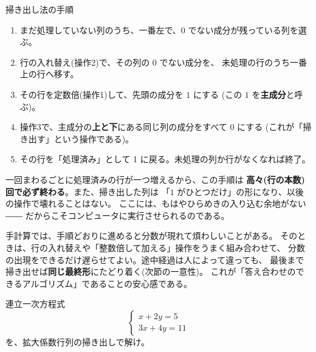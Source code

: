 \begin{itembox}[l]{掃き出し法の手順}
\begin{enumerate}
\item まだ処理していない列のうち、一番左で、$0$ でない成分が残っている列を選ぶ。
\item 行の入れ替え(操作2)で、その列の $0$ でない成分を、
未処理の行のうち一番上の行へ移す。
\item その行を定数倍(操作1)して、先頭の成分を $1$ にする
(この $1$ を\textbf{主成分}と呼ぶ)。
\item 操作3で、主成分の\textbf{上と下}にある同じ列の成分をすべて $0$ にする
(これが「掃き出す」という操作である)。
\item その行を「処理済み」として 1 に戻る。未処理の列か行がなくなれば終了。
\end{enumerate}
\end{itembox}

一回まわるごとに処理済みの行が一つ増えるから、この手順は
\textbf{高々(行の本数)回で必ず終わる}。また、掃き出した列は
「$1$ がひとつだけ」の形になり、以後の操作で壊れることはない。
ここには、もはやひらめきの入り込む余地がない――
だからこそコンピュータに実行させられるのである。

\begin{chui}
手計算では、手順どおりに進めると分数が現れて煩わしいことがある。
そのときは、行の入れ替えや「整数倍して加える」操作をうまく組み合わせて、
分数の出現をできるだけ遅らせてよい。途中経過は人によって違っても、
最後まで掃き出せば\textbf{同じ最終形}にたどり着く(次節の一意性)。
これが「答え合わせのできるアルゴリズム」であることの安心感である。
\end{chui}

\begin{mondai}\label{q:gauss}    %
連立一次方程式
\[
\begin{cases}
x + 2y = 5 \\
3x + 4y = 11
\end{cases}
\]
を、拡大係数行列の掃き出しで解け。
\end{mondai}

